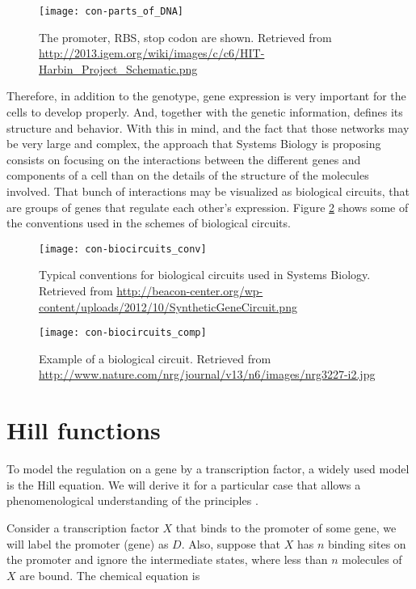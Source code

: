 \begin{figure}[H]
  \centering
  \texttt{[image: con-parts\_of\_DNA]}
  \caption[Parts of a gene]{\label{fig:con-parts_of_DNA} The promoter, RBS, stop codon are shown. Retrieved from \url{http://2013.igem.org/wiki/images/c/c6/HIT-Harbin_Project_Schematic.png}}
\end{figure}

Therefore, in addition to the genotype, gene expression is very important for the cells to develop properly. And, together with the genetic information, defines its structure and behavior. With this in mind, and the fact that those networks may be very large and complex, the approach that Systems Biology is proposing consists on focusing on the interactions between the different genes and components of a cell than on the details of the structure of the molecules involved. That bunch of interactions may be visualized as biological circuits, that are groups of genes that regulate each other's expression. Figure \ref{fig:con-biocircuits_conv} shows some of the conventions used in the schemes of biological circuits.

\begin{figure}[H]
  \centering
  \texttt{[image: con-biocircuits\_conv]}
  \caption[Systems biology conventions]{\label{fig:con-biocircuits_conv} Typical conventions for biological circuits used in Systems Biology. Retrieved from \url{http://beacon-center.org/wp-content/uploads/2012/10/SyntheticGeneCircuit.png}}
\end{figure}

\begin{figure}[H]
  \centering
  \texttt{[image: con-biocircuits\_comp]}
  \caption[Example of a biological circuit]{\label{fig:con-biocircuits_comp} Example of a biological circuit. Retrieved from \url{http://www.nature.com/nrg/journal/v13/n6/images/nrg3227-i2.jpg}}
\end{figure}

\section{Hill functions}

To model the regulation on a gene by a transcription factor, a widely used model is the Hill equation. We will derive it for a particular case that allows a phenomenological understanding of the principles \cite{alon06}.

Consider a transcription factor $X$ that binds to the promoter of some gene, we will label the promoter (gene) as $D$. Also, suppose that $X$ has $n$ binding sites on the promoter and ignore the intermediate states, where less than $n$ molecules of $X$ are bound. The chemical equation is

